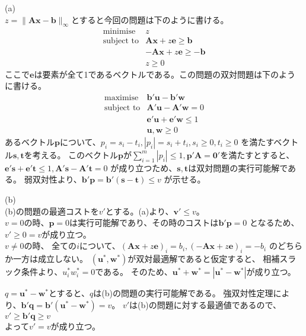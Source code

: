 \documentclass{jsarticle}
\begin{document}
(a)\\
$z = \|\bm{Ax}-\bm{b}\|_\infty$とすると今回の問題は下のように書ける。
\begin{equation}
  \begin{array}{cc}
    \text{minimise} & z\\
    \text{subject to} & \bm{Ax}+z\bm{e} \geq \bm{b}\\
    & -\bm{Ax}+z\bm{e} \geq -\bm{b}\\
    & z \geq 0
  \end{array}
\end{equation}
ここで$\bm{e}$は要素が全て1であるベクトルである。この問題の双対問題は下のように書ける。
\begin{equation}
  \begin{array}{cc}
    \text{maximise} & \bm{b}'\bm{u}-\bm{b}'\bm{w}\\
    \text{subject to} & \bm{A}'\bm{u}-\bm{A}'\bm{w} = 0\\
    & \bm{e}'\bm{u}+\bm{e}'\bm{w} \leq 1\\
    & \bm{u},\bm{w} \geq 0
  \end{array}
\end{equation}
あるベクトル$\bm{p}$について、$p_i=s_i-t_i,|p_i|=s_i+t_i,s_i\geq 0,t_i\geq 0$
を満たすベクトル$\bm{s},\bm{t}$を考える。
このベクトル$\bm{p}$が$\sum^m_{i=1}|p_i|\leq 1,\bm{p}'\bm{A}=\bm{0}'$を満たすとすると、
$\bm{e}'\bm{s}+\bm{e}'\bm{t} \leq 1,\bm{A}'\bm{s}-\bm{A}'\bm{t} = 0$
が成り立つため、$\bm{s},\bm{t}$は双対問題の実行可能解である。
弱双対性より、$\bm{b}'\bm{p}=\bm{b}'(\bm{s}-\bm{t})\leq v$
が示せる。
 \par
(b)\\
(b)の問題の最適コストを$v'$とする。(a)より、$\bm{v}'\leq v$。\\
$v=0$の時、$\bm{p}=0$は実行可能解であり、その時のコストは$\bm{b}'\bm{p}=0$
となるため、$v'\geq 0 = v$が成り立つ。\\
$v\neq 0$の時、
全ての$i$について、$(\bm{Ax} + z\bm{e})_i = b_i , 
(-\bm{Ax} + z\bm{e})_i = -b_i$ のどちらか一方は成立しない。
$(\bm{u}^*,\bm{w}^*)$が双対最適解であると仮定すると、
相補スラック条件より、$u^*_iw^*_i = 0$である。
そのため、$\bm{u}^*+\bm{w}^*=|\bm{u}^*-\bm{w}^*|$が成り立つ。

$q=\bm{u}^*-\bm{w}^*$とすると、$q$は(b)の問題の実行可能解である。
強双対性定理により、$\bm{b}'\bm{q}=\bm{b}'(\bm{u}^*-\bm{w}^*)=v$。
$v'$は(b)の問題に対する最適値であるので、$v'\geq \bm{b}'\bm{q}\geq v$\\
よって$v'=v$が成り立つ。
\end{document}
